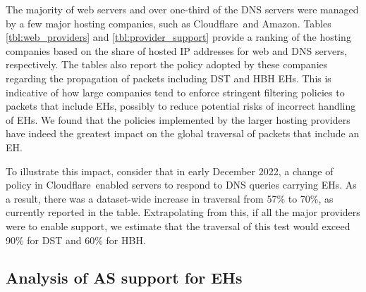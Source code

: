 \documentclass[conference]{IEEEtran}
\begin{document}
The majority of web servers and over one-third of the
DNS servers were managed by a few major hosting companies, such
as Cloudflare\texttrademark\ and Amazon\texttrademark.  Tables
\ref{tbl:web_providers} and \ref{tbl:provider_support} provide a ranking of the
hosting companies based on the share of hosted IP addresses for web and DNS
servers, respectively. The tables also report the policy adopted by these
companies regarding the propagation of packets including DST and HBH EHs.  
This is indicative of how large companies tend to enforce stringent filtering policies to
packets that include EHs, possibly to reduce potential
risks of incorrect handling of EHs.  We found that the policies implemented by
the larger hosting providers have indeed the greatest impact on the global
traversal of packets that include an EH. 



To illustrate this impact, consider that in early December 2022, a change of
policy in Cloudflare\texttrademark\ enabled servers to respond to DNS queries
carrying EHs.  As a result, there was a dataset-wide increase in traversal
from 57\% to 70\%, as currently reported in the table.  Extrapolating from
this, if all the major providers were to enable support, we estimate that the
traversal of this test would exceed 90\% for DST and 60\% for HBH.


\subsection{Analysis of AS support for EHs}
\end{document}
